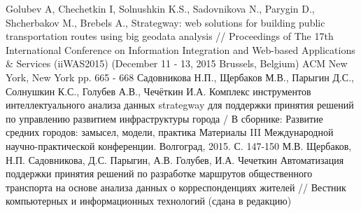 \renewcommand{\bibname}{Публикации по теме диссертации}
\begin{thebibliography}{10}
     Golubev A, Chechetkin I, Solnushkin K.S., Sadovnikova N., Parygin D., Shcherbakov M., 
        Brebels A., Strategway: web solutions for building public transportation routes using big geodata 
        analysis // Proceedings of The 17th International Conference on Information Integration and 
        Web-based Applications \& Services (iiWAS2015) (December 11 - 13, 2015 Brussels, Belgium) 
        ACM New York, New York pp. 665 - 668
     Садовникова Н.П., Щербаков М.В., Парыгин Д.С., Солнушкин К.С., Голубев А.В., 
        Чечёткин И.А. Комплекс инструментов интеллектуального анализа данных strategway для поддержки 
        принятия решений по управлению развитием инфраструктуры города / В сборнике: Развитие средних 
        городов: замысел, модели, практика Материалы III Международной научно-практической конференции. 
        Волгоград, 2015. С. 147-150
     М.В. Щербаков, Н.П. Садовникова, Д.С. Парыгин, А.В. Голубев, И.А. Чечеткин 
        Автоматизация поддержки принятия решений по разработке маршрутов общественного транспорта на 
        основе анализа данных о корреспонденциях жителей // Вестник компьютерных и информационных 
        технологий (сдана в редакцию)
\end{thebibliography}